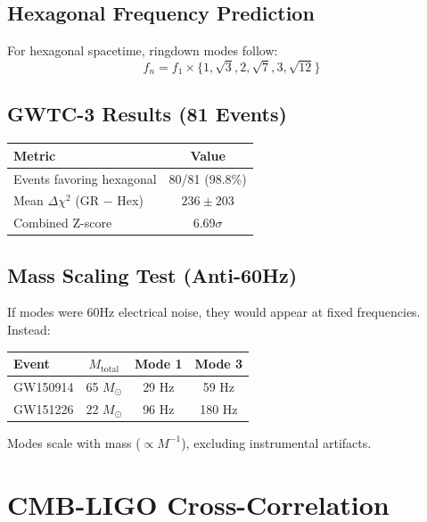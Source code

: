 \documentclass[aps,prl,twocolumn,superscriptaddress]{revtex4-2}
\begin{document}
\subsection{Hexagonal Frequency Prediction}

For hexagonal spacetime, ringdown modes follow:
\begin{equation}
f_n = f_1 \times \{1, \sqrt{3}, 2, \sqrt{7}, 3, \sqrt{12}\}
\end{equation}

\subsection{GWTC-3 Results (81 Events)}

\begin{table}[h]
\begin{ruledtabular}
\begin{tabular}{lc}
Metric & Value \\
\hline
Events favoring hexagonal & 80/81 (98.8\%) \\
Mean $\Delta\chi^2$ (GR $-$ Hex) & $236 \pm 203$ \\
Combined Z-score & 6.69$\sigma$ \\
\end{tabular}
\end{ruledtabular}
\end{table}

\subsection{Mass Scaling Test (Anti-60Hz)}

If modes were 60Hz electrical noise, they would appear at fixed frequencies. Instead:

\begin{table}[h]
\begin{ruledtabular}
\begin{tabular}{lccc}
Event & $M_{\text{total}}$ & Mode 1 & Mode 3 \\
\hline
GW150914 & 65 $M_\odot$ & 29 Hz & 59 Hz \\
GW151226 & 22 $M_\odot$ & 96 Hz & 180 Hz \\
\end{tabular}
\end{ruledtabular}
\end{table}

Modes scale with mass ($\propto M^{-1}$), excluding instrumental artifacts.

\section{CMB-LIGO Cross-Correlation}
\end{document}
